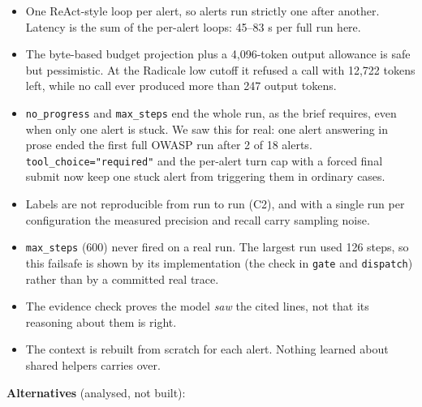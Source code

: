 \documentclass[
  10pt,
]{article}
\providecommand{\tightlist}{%
  \setlength{\itemsep}{0pt}\setlength{\parskip}{0pt}}
\begin{document}
\begin{itemize}
\tightlist
\item
  One ReAct-style loop per alert, so alerts run strictly one after
  another. Latency is the sum of the per-alert loops: 45--83 s per full
  run here.
\item
  The byte-based budget projection plus a 4,096-token output allowance
  is safe but pessimistic. At the Radicale low cutoff it refused a call
  with 12,722 tokens left, while no call ever produced more than 247
  output tokens.
\item
  \texttt{no\_progress} and \texttt{max\_steps} end the whole run, as
  the brief requires, even when only one alert is stuck. We saw this for
  real: one alert answering in prose ended the first full OWASP run
  after 2 of 18 alerts. \texttt{tool\_choice="required"} and the
  per-alert turn cap with a forced final submit now keep one stuck alert
  from triggering them in ordinary cases.
\item
  Labels are not reproducible from run to run (C2), and with a single
  run per configuration the measured precision and recall carry sampling
  noise.
\item
  \texttt{max\_steps} (600) never fired on a real run. The largest run
  used 126 steps, so this failsafe is shown by its implementation (the
  check in \texttt{gate} and \texttt{dispatch}) rather than by a
  committed real trace.
\item
  The evidence check proves the model \emph{saw} the cited lines, not
  that its reasoning about them is right.
\item
  The context is rebuilt from scratch for each alert. Nothing learned
  about shared helpers carries over.
\end{itemize}

\textbf{Alternatives} (analysed, not built):
\end{document}

